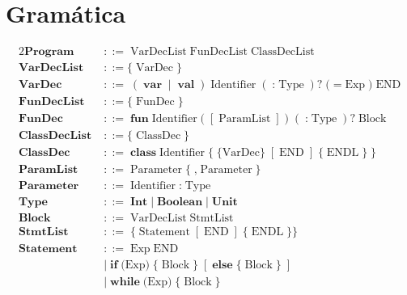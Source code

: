 \documentclass[a4paper,10pt]{article}
\begin{document}
\section*{Gramática}

\begin{alignat*}{2}
\textbf{Program}
  \;&::=  \; \text{VarDecList} 
    \; \text{FunDecList} 
    \;\text{ClassDecList}  \\[3pt]
\textbf{VarDecList}
\;&::= \{ \; \text{VarDec}\; \} \\[3pt]
\textbf{VarDec}
  \;&::=\; (\;\textbf{var}\;\mid\;\textbf{val}\;)\;\text{Identifier}
     \;(\;\textbf{:}\;\text{Type}\;)?
     \; \text{(} \; \textbf{=}\;\text{Exp} \; \text{)} \;\text{END} \\[3pt]
\textbf{FunDecList}
\;&::= \{ \; \text{FunDec}\; \} \\[3pt]
\textbf{FunDec}
  \;&::=\; \textbf{fun}\;\text{Identifier}
     \;\textbf{(}\;[\;\text{ParamList}\;]\;\textbf{)}
     \;(\;\textbf{:}\;\text{Type}\;)?
     \;\text{Block} \\[3pt]
\textbf{ClassDecList}
\;&::= \{ \; \text{ClassDec}\; \} \\[3pt]
\textbf{ClassDec}
  \;&::=\; \textbf{class}\;\text{Identifier}
     \;\textbf{\{}\;\text{\{VarDec\}}\;[\;\text{END}\;]\;\{\;\text{ENDL}\;\}\;\textbf{\}} \\[3pt]
\textbf{ParamList}
  \;&::=\; \text{Parameter} \; \{ \; \textbf{,} \; \text{Parameter} \;\} \\[3pt]
\textbf{Parameter}
  \;&::=\; \text{Identifier}\;\textbf{:}\;\text{Type} \\[3pt]
\textbf{Type}
  \;&::=\; \textbf{Int}
   \;|\;\textbf{Boolean}
   \;|\;\textbf{Unit} \\[3pt]
\textbf{Block}
  \;&::=\; \text{VarDecList}  \; \text{StmtList} \; \\[3pt]
\textbf{StmtList}
  \;&::=\; \{\;\text{Statement}\;[\;\text{END}\;]\;\{\;\text{ENDL}\;\}\} \\[3pt]
\textbf{Statement}
\;&::=\;  \text{Exp}\;\text{END} \\
  \;&\mid\; \textbf{if}\;\textbf{(} \text{Exp} \textbf{)}\; \{ \; \text{Block} \; \}
     \;[\;\textbf{else} \; \{  \;\text{Block} \; \} \;] \\[3pt]
  \;&\mid\; \textbf{while}\;\textbf{(} \text{Exp} \textbf{)}\; \{ \; \text{Block}\; \} \\[3pt]

\end{alignat*}
\end{document}
